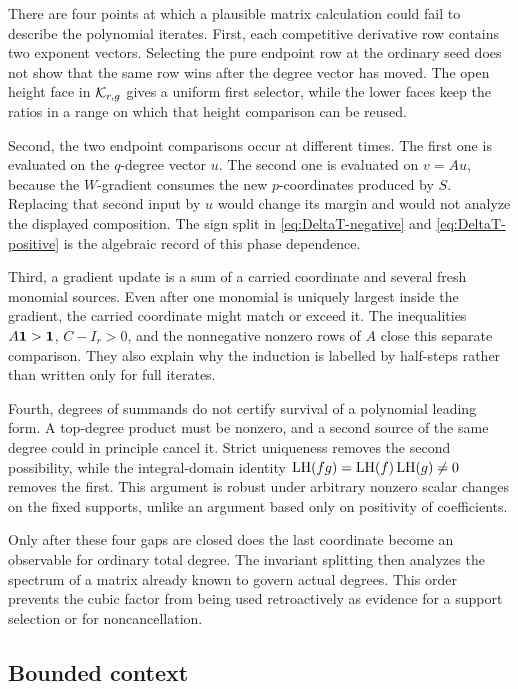 \documentclass[11pt]{article}
\theoremstyle{remark}
\numberwithin{equation}{section}
\begin{document}
There are four points at which a plausible matrix calculation could fail to
describe the polynomial iterates.  First, each competitive derivative row
contains two exponent vectors.  Selecting the pure endpoint row at the
ordinary seed does not show that the same row wins after the degree vector
has moved.  The open height face in \(\mathcal{K}_{r,g}\) gives a uniform first
selector, while the lower faces keep the ratios in a range on which that
height comparison can be reused.

Second, the two endpoint comparisons occur at different times.  The first
one is evaluated on the \(q\)-degree vector \(u\).  The second one is
evaluated on \(v=Au\), because the \(W\)-gradient consumes the new
\(p\)-coordinates produced by \(S\).  Replacing that second input by \(u\)
would change its margin and would not analyze the displayed composition.
The sign split in \eqref{eq:DeltaT-negative} and
\eqref{eq:DeltaT-positive} is the algebraic record of this phase
dependence.

Third, a gradient update is a sum of a carried coordinate and several fresh
monomial sources.  Even after one monomial is uniquely largest inside the
gradient, the carried coordinate might match or exceed it.  The inequalities
\(A\mathbf{1}>\mathbf{1}\), \(C-I_r>0\), and the nonnegative nonzero rows of \(A\)
close this separate comparison.  They also explain why the induction is
labelled by half-steps rather than written only for full iterates.

Fourth, degrees of summands do not certify survival of a polynomial leading
form.  A top-degree product must be nonzero, and a second source of the same
degree could in principle cancel it.  Strict uniqueness removes the second
possibility, while the integral-domain identity
\(\operatorname{LH}(fg)=\operatorname{LH}(f)\operatorname{LH}(g)\neq0\) removes the first.  This argument is robust
under arbitrary nonzero scalar changes on the fixed supports, unlike an
argument based only on positivity of coefficients.

Only after these four gaps are closed does the last coordinate become an
observable for ordinary total degree.  The invariant splitting then analyzes
the spectrum of a matrix already known to govern actual degrees.  This order
prevents the cubic factor from being used retroactively as evidence for a
support selection or for noncancellation.

\subsection*{Bounded context}
\end{document}
